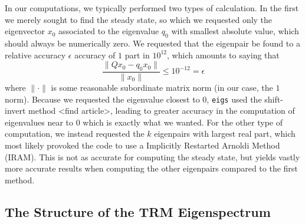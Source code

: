 In our computations, we typically performed two types of calculation. In the first we merely sought to
find the steady state, so which we requested only the eigenvector $x_0$
associated to the
eigenvalue $q_0$ with smallest absolute value, which should always be numerically zero.
We requested that the eigenpair be found to a relative accuracy $\epsilon$ accuracy of $1$ part in $10^{12}$,
which amounts to saying that
\begin{equation} \label{eq:linAlgRelAcc}
 \frac{\| Q x_0 - q_0 x_0 \|}{\| x_0 \|} \le 10^{-12} = \epsilon
\end{equation}
where $\| \cdot \|$ is some reasonable subordinate matrix norm (in our case, the $1$ norm). Because we requested the eigenvalue closest to $0$, \texttt{eigs} used the
shift-invert method <find article>, leading to greater accuracy in the computation of
eigenvalues near to $0$ which is exactly what we wanted. For the other type of
computation, we instead requested the $k$ eigenpairs with largest real part, which
most likely provoked the code to use a Implicitly Restarted Arnoldi Method (IRAM).
This is not as accurate for computing the steady state, but yields vastly more accurate
results when computing the other eigenpairs compared to the first method. 

\subsection{The Structure of the TRM Eigenspectrum} \label{sec:trmEigenspec}

